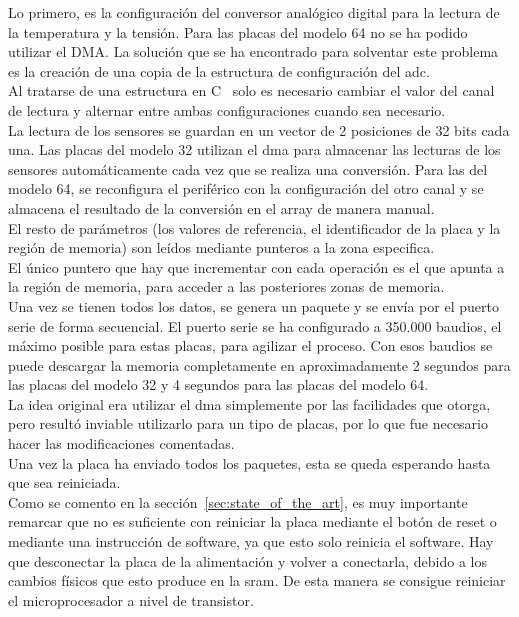\documentclass[spanish]{template/minim}
\begin{document}
Lo primero, es la configuración del conversor analógico digital para la lectura de la temperatura y la tensión. Para las placas del modelo 64 no se ha podido utilizar el DMA. La solución que se ha encontrado para solventar este problema es la creación de una copia de la estructura de configuración del \gls{adc}.\\

Al tratarse de una estructura en C~ solo es necesario cambiar el valor del canal de lectura y alternar entre ambas configuraciones cuando sea necesario.\\

La lectura de los sensores se guardan en un vector de 2 posiciones de 32 bits cada una. Las placas del modelo 32 utilizan el \gls{dma} para almacenar las lecturas de los sensores automáticamente cada vez que se realiza una conversión. Para las del modelo 64, se reconfigura el periférico con la configuración del otro canal y se almacena el resultado de la conversión en el array de manera manual.\\

El resto de parámetros (los valores de referencia, el identificador de la placa y la región de memoria) son leídos mediante punteros a la zona especifica.\\

El único puntero que hay que incrementar con cada operación es el que apunta a la región de memoria, para acceder a las posteriores zonas de memoria.\\

Una vez se tienen todos los datos, se genera un paquete y se envía por el puerto serie de forma secuencial. El puerto serie se ha configurado a 350.000 baudios, el máximo posible para estas placas, para agilizar el proceso. Con esos baudios se puede descargar la memoria completamente en aproximadamente 2 segundos para las placas del modelo 32 y 4 segundos para las placas del modelo 64.\\

La idea original era utilizar el \gls{dma} simplemente por las facilidades que otorga, pero resultó inviable utilizarlo para un tipo de placas, por lo que fue necesario hacer las modificaciones comentadas.\\

Una vez la placa ha enviado todos los paquetes, esta se queda esperando hasta que sea reiniciada.\\

Como se comento en la sección~\ref{sec:state_of_the_art}, es muy importante remarcar que no es suficiente con reiniciar la placa mediante el botón de reset o mediante una instrucción de software, ya que esto solo reinicia el software. Hay que desconectar la placa de la alimentación y volver a conectarla, debido a los cambios físicos que esto produce en la \gls{sram}. De esta manera se consigue reiniciar el microprocesador a nivel de transistor.\\
\end{document}
